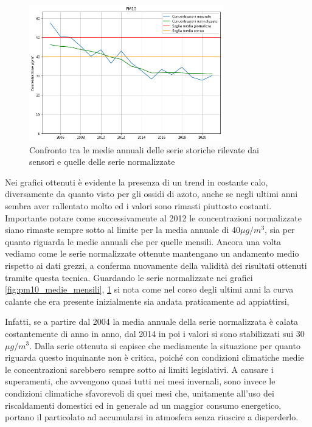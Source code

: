 \documentclass[a4paper]{report}
\begin{document}
\begin{figure}[h]
\centering
\includegraphics[width=0.75\textwidth]{pm10_medie_annuali}
\caption{Confronto tra le medie annuali delle serie storiche rilevate dai sensori e quelle delle serie normalizzate}
\label{fig:pm10_medie_annuali}
\end{figure}

Nei grafici ottenuti è evidente la presenza di un trend in costante calo, diversamente da quanto visto per gli ossidi di azoto, anche se negli ultimi anni sembra aver rallentato molto ed i valori sono rimasti piuttosto costanti.
Importante notare come successivamente al 2012 le concentrazioni normalizzate siano rimaste sempre sotto al limite per la media annuale di 40$\mu g/m^3$, sia per quanto riguarda le medie annuali che per quelle mensili.
Ancora una volta vediamo come le serie normalizzate ottenute mantengano un andamento medio rispetto ai dati grezzi, a conferma nuovamente della validità dei risultati ottenuti tramite questa tecnica.
Guardando le serie normalizzate nei grafici \ref{fig:pm10_medie_mensili}, \ref{fig:pm10_medie_annuali} si nota come nel corso degli ultimi anni la curva calante che era presente inizialmente sia andata praticamente ad appiattirsi,

Infatti, se a partire dal 2004 la media annuale della serie normalizzata è calata costantemente di anno in anno, dal 2014 in poi i valori si sono stabilizzati sui 30$\mu g/m^3$. Dalla serie ottenuta si capisce che mediamente la situazione per quanto riguarda questo inquinante non è critica, poiché con condizioni climatiche medie le concentrazioni sarebbero sempre sotto ai limiti legislativi. A causare i superamenti, che avvengono quasi tutti nei mesi invernali, sono invece le condizioni climatiche sfavorevoli di quei mesi che, unitamente all'uso dei riscaldamenti domestici ed in generale ad un maggior consumo energetico, portano il particolato ad accumularsi in atmosfera senza riuscire a disperderlo.
\end{document}
